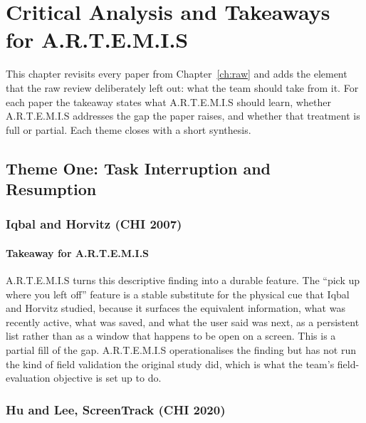\documentclass[11pt,a4paper]{report}
\newcommand{\artemis}{A.R.T.E.M.I.S}
\begin{document}
\chapter{Critical Analysis and Takeaways for \artemis{}}
\label{ch:analysis}

This chapter revisits every paper from Chapter~\ref{ch:raw} and adds the
element that the raw review deliberately left out: what the team should
take from it. For each paper the takeaway states what \artemis{} should
learn, whether \artemis{} addresses the gap the paper raises, and
whether that treatment is full or partial. Each theme closes with a
short synthesis.

\section{Theme One: Task Interruption and Resumption}

\subsection{Iqbal and Horvitz (CHI 2007)}

\subsubsection{Takeaway for \artemis{}}

\artemis{} turns this descriptive finding into a durable feature. The
\enquote{pick up where you left off} feature is a stable substitute for
the physical cue that Iqbal and Horvitz studied, because it surfaces the
equivalent information, what was recently active, what was saved, and
what the user said was next, as a persistent list rather than as a
window that happens to be open on a screen. This is a partial fill of
the gap. \artemis{} operationalises the finding but has not run the kind
of field validation the original study did, which is what the team's
field-evaluation objective is set up to do.

\subsection{Hu and Lee, ScreenTrack (CHI 2020)}
\end{document}
